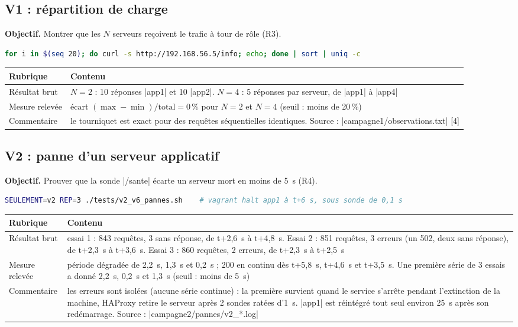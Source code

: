 \documentclass[a4paper,11pt]{article}
\begin{document}
\subsection{V1 : répartition de charge}
\textbf{Objectif.} Montrer que les $N$ serveurs reçoivent le trafic à tour de rôle (R3).
\begin{lstlisting}[language=bash]
for i in $(seq 20); do curl -s http://192.168.56.5/info; echo; done | sort | uniq -c
\end{lstlisting}
{\small
\begin{longtable}{@{}L{3.2cm}L{12.4cm}@{}}
\toprule
\textbf{Rubrique} & \textbf{Contenu}\\ \midrule\endhead
Résultat brut & $N=2$ : 10 réponses |app1| et 10 |app2|. $N=4$ : 5 réponses par serveur, de |app1| à |app4|\\
Mesure relevée & écart $(\max-\min)/\text{total}=0\,\%$ pour $N=2$ et $N=4$ (seuil : moins de 20\,\%)\\
Commentaire & le tourniquet est exact pour des requêtes séquentielles identiques. Source : |campagne1/observations.txt| [4]\\
\bottomrule
\end{longtable}}

\subsection{V2 : panne d'un serveur applicatif}
\textbf{Objectif.} Prouver que la sonde |/sante| écarte un serveur mort en moins de 5~s (R4).
\begin{lstlisting}[language=bash]
SEULEMENT=v2 REP=3 ./tests/v2_v6_pannes.sh    # vagrant halt app1 à t+6 s, sous sonde de 0,1 s
\end{lstlisting}
{\small
\begin{longtable}{@{}L{3.2cm}L{12.4cm}@{}}
\toprule
\textbf{Rubrique} & \textbf{Contenu}\\ \midrule\endhead
Résultat brut & essai 1 : 843 requêtes, 3 sans réponse, de t+2,6~s à t+4,8~s. Essai 2 : 851 requêtes, 3 erreurs (un 502, deux sans réponse), de t+2,3~s à t+3,6~s. Essai 3 : 860 requêtes, 2 erreurs, de t+2,3~s à t+2,5~s\\
Mesure relevée & période dégradée de 2,2~s, 1,3~s et 0,2~s ; 200 en continu dès t+5,8~s, t+4,6~s et t+3,5~s. Une première série de 3 essais a donné 2,2~s, 0,2~s et 1,3~s (seuil : moins de 5~s)\\
Commentaire & les erreurs sont isolées (aucune série continue) : la première survient quand le service s'arrête pendant l'extinction de la machine, HAProxy retire le serveur après 2 sondes ratées d'1~s. |app1| est réintégré tout seul environ 25~s après son redémarrage. Source : |campagne2/pannes/v2_*.log|\\
\bottomrule
\end{longtable}}
\end{document}
